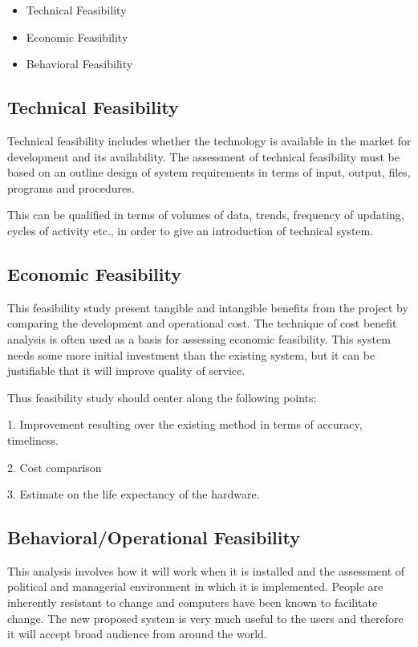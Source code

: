 \begin{itemize}
\item{Technical Feasibility}

	\item{Economic Feasibility}

	\item{Behavioral Feasibility}
\end{itemize}

\subsection{Technical Feasibility }
Technical feasibility includes whether the technology is available in the market for development and its availability. The assessment of technical feasibility must be based on an outline design of system requirements in terms of input, output, files, programs and procedures.

This can be qualified in terms of volumes of data, trends, frequency of updating, cycles of activity etc., in order to give an introduction of technical system.
\subsection{Economic Feasibility}
This feasibility study present tangible and intangible benefits from the project by comparing the development and operational cost. The technique of cost benefit analysis is often used as a basis for assessing economic feasibility. This system needs some more initial investment than the existing system, but it can be justifiable that it will improve quality of service.

Thus feasibility study should center along the following points:

1. Improvement resulting over the existing method in terms of accuracy, timeliness.

2. Cost comparison

3. Estimate on the life expectancy of the hardware.
\subsection{Behavioral/Operational Feasibility}
This analysis involves how it will work when it is installed and the assessment of political and managerial environment in which it is implemented. People are inherently resistant to change and computers have been known to facilitate change. The new proposed system is very much useful to the users and therefore it will accept broad audience from around the world.


